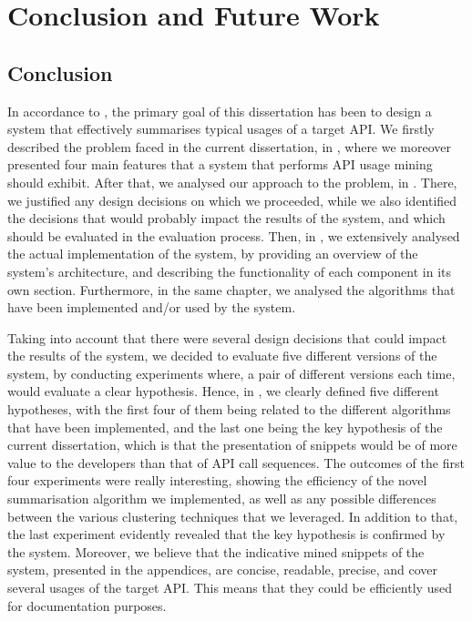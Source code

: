 \chapter{Conclusion and Future Work}
\label{chap:conclusion}

\section{Conclusion}
\label{sec:conclusion}

In accordance to , the primary goal of this dissertation has been to design a system that effectively summarises typical usages of a target API. We firstly described the problem faced in the current dissertation, in , where we moreover presented four main features that a system that performs API usage mining should exhibit. After that, we analysed our approach to the problem, in . There, we justified any design decisions on which we proceeded, while we also identified the decisions that would probably impact the results of the system, and which should be evaluated in the evaluation process. Then, in , we extensively analysed the actual implementation of the system, by providing an overview of the system's architecture, and describing the functionality of each component in its own section. Furthermore, in the same chapter, we analysed the algorithms that have been implemented and/or used by the system.

Taking into account that there were several design decisions that could impact the results of the system, we decided to evaluate five different versions of the system, by conducting experiments where, a pair of different versions each time, would evaluate a clear hypothesis. Hence, in , we clearly defined five different hypotheses, with the first four of them being related to the different algorithms that have been implemented, and the last one being the key hypothesis of the current dissertation, which is that the presentation of snippets would be of more value to the developers than that of API call sequences. The outcomes of the first four experiments were really interesting, showing the efficiency of the novel summarisation algorithm we implemented, as well as any possible differences between the various clustering techniques that we leveraged. In addition to that, the last experiment evidently revealed that the key hypothesis is confirmed by the system. Moreover, we believe that the indicative mined snippets of the system, presented in the appendices, are concise, readable, precise, and cover several usages of the target API. This means that they could be efficiently used for documentation purposes.

